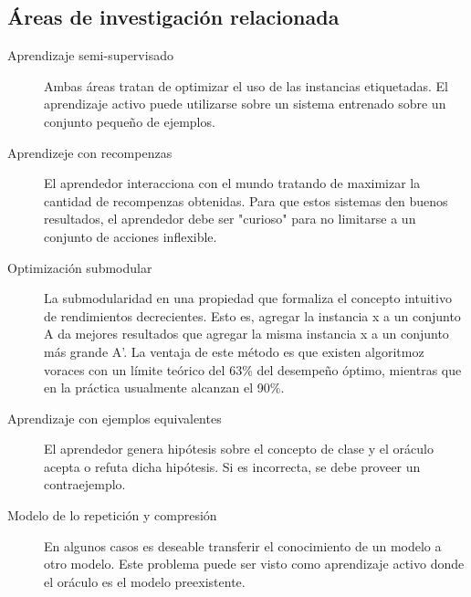 \documentclass[11pt,spanish]{article}
\begin{document}
\subsection{Áreas de investigación relacionada}
\begin{description}
    \item[Aprendizaje semi-supervisado] Ambas áreas tratan de optimizar el uso
    de las instancias etiquetadas. El aprendizaje activo puede utilizarse sobre
    un sistema entrenado sobre un conjunto pequeño de ejemplos.
    \item[Aprendizeje con recompenzas] El aprendedor interacciona con el mundo
    tratando de maximizar la cantidad de recompenzas obtenidas. Para que estos
    sistemas den buenos resultados, el aprendedor debe ser "curioso" para no
    limitarse a un conjunto de acciones inflexible.
    \item[Optimización submodular] La submodularidad en una propiedad que
    formaliza el concepto intuitivo de rendimientos decrecientes. Esto es,
    agregar la instancia x a un conjunto A da mejores resultados que agregar
    la misma instancia x a un conjunto más grande A'. La ventaja de este método
    es que existen algoritmoz voraces con un límite teórico del 63\% del
    desempeño óptimo, mientras que en la práctica usualmente alcanzan el 90\%.
    \item[Aprendizaje con ejemplos equivalentes] El aprendedor genera hipótesis
    sobre el concepto de clase y el oráculo acepta o refuta dicha hipótesis. Si
    es incorrecta, se debe proveer un contraejemplo.
    \item[Modelo de lo repetición y compresión] En algunos casos es deseable
    transferir el conocimiento de un modelo a otro modelo. Este problema puede
    ser visto como aprendizaje activo donde el oráculo es el modelo
    preexistente.
\end{description}
\end{document}
